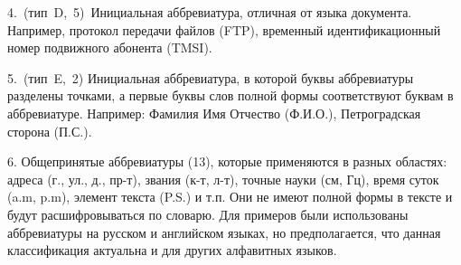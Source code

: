\documentclass[a4paper]{article}
\begin{document}
\par4. (тип D, 5) Инициальная аббревиатура, отличная от языка документа. Например, протокол передачи файлов (FTP), временный идентификационный номер подвижного абонента (TMSI).
\par5. (тип E, 2) Инициальная аббревиатура, в которой буквы аббревиатуры разделены точками, а первые буквы слов полной формы соответствуют буквам в аббревиатуре. Например: Фамилия Имя Отчество (Ф.И.О.), Петроградская сторона (П.С.).
\par6. Общепринятые аббревиатуры (13), которые применяются в разных областях: адреса (г., ул., д., пр-т), звания (к-т, л-т), точные науки (см, Гц), время суток (a.m, p.m), элемент текста (P.S.) и т.п. Они не имеют полной формы в тексте и будут расшифровываться по словарю.
Для примеров были использованы аббревиатуры на русском и английском языках, но предполагается, что данная классификация актуальна и для других алфавитных языков.
\end{document}
